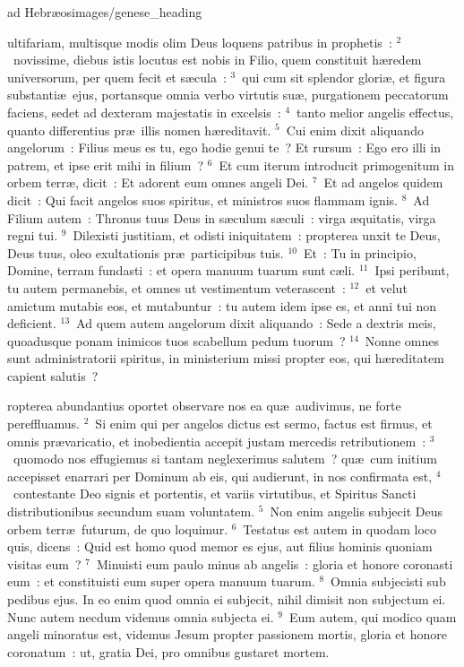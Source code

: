 {ad Hebræos}{images/genese_heading}


\bchapter
{}ultifariam, multisque modis olim Deus loquens patribus in prophetis~:
${}^{2}$~novissime, diebus istis locutus est nobis in Filio, quem constituit h\ae redem universorum, per quem fecit et s\ae cula~:
${}^{3}$~qui cum sit splendor glori\ae , et figura substanti\ae\ ejus, portansque omnia verbo virtutis su\ae , purgationem peccatorum faciens, sedet ad dexteram majestatis in excelsis~:
${}^{4}$~tanto melior angelis effectus, quanto differentius pr\ae\ illis nomen h\ae reditavit.
${}^{5}$~Cui enim dixit aliquando angelorum~: Filius meus es tu, ego hodie genui te~? Et rursum~: Ego ero illi in patrem, et ipse erit mihi in filium~?
${}^{6}$~Et cum iterum introducit primogenitum in orbem terr\ae , dicit~: Et adorent eum omnes angeli Dei.
${}^{7}$~Et ad angelos quidem dicit~: Qui facit angelos suos spiritus, et ministros suos flammam ignis.
${}^{8}$~Ad Filium autem~: Thronus tuus Deus in s\ae culum s\ae culi~: virga \ae quitatis, virga regni tui.
${}^{9}$~Dilexisti justitiam, et odisti iniquitatem~: propterea unxit te Deus, Deus tuus, oleo exultationis pr\ae\ participibus tuis.
${}^{10}$~Et~: Tu in principio, Domine, terram fundasti~: et opera manuum tuarum sunt c\ae li.
${}^{11}$~Ipsi peribunt, tu autem permanebis, et omnes ut vestimentum veterascent~:
${}^{12}$~et velut amictum mutabis eos, et mutabuntur~: tu autem idem ipse es, et anni tui non deficient.
${}^{13}$~Ad quem autem angelorum dixit aliquando~: Sede a dextris meis, quoadusque ponam inimicos tuos scabellum pedum tuorum~?
${}^{14}$~Nonne omnes sunt administratorii spiritus, in ministerium missi propter eos, qui h\ae reditatem capient salutis~?

\bchapter
{}ropterea abundantius oportet observare nos ea qu\ae\ audivimus, ne forte pereffluamus.
${}^{2}$~Si enim qui per angelos dictus est sermo, factus est firmus, et omnis pr\ae varicatio, et inobedientia accepit justam mercedis retributionem~:
${}^{3}$~quomodo nos effugiemus si tantam neglexerimus salutem~? qu\ae\ cum initium accepisset enarrari per Dominum ab eis, qui audierunt, in nos confirmata est,
${}^{4}$~contestante Deo signis et portentis, et variis virtutibus, et Spiritus Sancti distributionibus secundum suam voluntatem.
${}^{5}$~Non enim angelis subjecit Deus orbem terr\ae\ futurum, de quo loquimur.
${}^{6}$~Testatus est autem in quodam loco quis, dicens~: Quid est homo quod memor es ejus, aut filius hominis quoniam visitas eum~?
${}^{7}$~Minuisti eum paulo minus ab angelis~: gloria et honore coronasti eum~: et constituisti eum super opera manuum tuarum.
${}^{8}$~Omnia subjecisti sub pedibus ejus. In eo enim quod omnia ei subjecit, nihil dimisit non subjectum ei. Nunc autem necdum videmus omnia subjecta ei.
${}^{9}$~Eum autem, qui modico quam angeli minoratus est, videmus Jesum propter passionem mortis, gloria et honore coronatum~: ut, gratia Dei, pro omnibus gustaret mortem.


